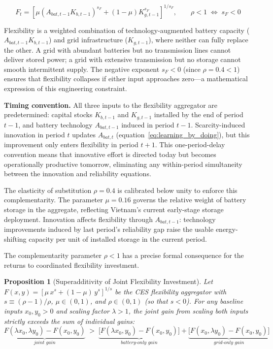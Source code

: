 \documentclass[12pt, a4paper]{article}
\newtheorem{proposition}{Proposition}
\begin{document}
\begin{equation}
F_t =
\left[
\mu (A_{bat,t-1} K_{b,t-1})^{s_F}
+
(1-\mu) K_{g,t-1}^{s_F}
\right]^{1/s_F},
\qquad \rho < 1 \;\Leftrightarrow\; s_F < 0
\label{eq:flexibility_bundle}
\end{equation}

Flexibility is a weighted combination of technology-augmented battery capacity ($A_{bat,t-1} K_{b,t-1}$) and grid infrastructure ($K_{g,t-1}$), where neither can fully replace the other. A grid with abundant batteries but no transmission lines cannot deliver stored power; a grid with extensive transmission but no storage cannot smooth intermittent supply. The negative exponent $s_F < 0$ (since $\rho = 0.4 < 1$) ensures that flexibility collapses if either input approaches zero---a mathematical expression of this engineering constraint.

\textbf{Timing convention.} All three inputs to the flexibility aggregator are predetermined: capital stocks $K_{b,t-1}$ and $K_{g,t-1}$ installed by the end of period $t-1$, and battery technology $A_{bat,t-1}$ induced in period $t-1$. Scarcity-induced innovation in period $t$ updates $A_{bat,t}$ (equation~\ref{eq:learning_by_doing}), but this improvement only enters flexibility in period $t+1$. This one-period-delay convention means that innovative effort is directed today but becomes operationally productive tomorrow, eliminating any within-period simultaneity between the innovation and reliability equations.

The elasticity of substitution $\rho = 0.4$ is calibrated below unity to enforce this complementarity. The parameter $\mu = 0.16$ governs the relative weight of battery storage in the aggregate, reflecting Vietnam's current early-stage storage deployment. Innovation affects flexibility through $A_{bat,t-1}$: technology improvements induced by last period's reliability gap raise the usable energy-shifting capacity per unit of installed storage in the current period.

The complementarity parameter $\rho < 1$ has a precise formal consequence for the returns to coordinated flexibility investment.

\begin{proposition}[Superadditivity of Joint Flexibility Investment] \label{prop:superadditivity}
Let $F(x, y) = [\mu \, x^{s} + (1-\mu) \, y^{s}]^{1/s}$ be the CES flexibility aggregator with $s \equiv (\rho - 1)/\rho$, $\mu \in (0,1)$, and $\rho \in (0,1)$ (so that $s < 0$). For any baseline inputs $x_0, y_0 > 0$ and scaling factor $\lambda > 1$, the joint gain from scaling both inputs strictly exceeds the sum of individual gains:
\begin{equation*}
\underbrace{F(\lambda x_0, \lambda y_0) - F(x_0, y_0)}_{\textit{joint gain}} \;>\; \underbrace{\bigl[F(\lambda x_0, y_0) - F(x_0, y_0)\bigr]}_{\textit{battery-only gain}} + \underbrace{\bigl[F(x_0, \lambda y_0) - F(x_0, y_0)\bigr]}_{\textit{grid-only gain}}
\end{equation*}
\end{proposition}
\end{document}
